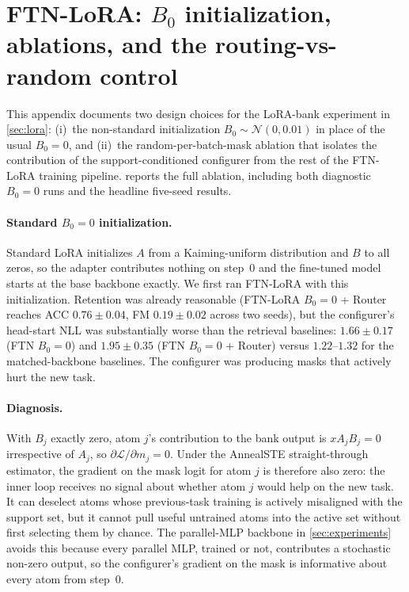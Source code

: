 \section{FTN-LoRA: $B_0$ initialization, ablations, and the routing-vs-random control}\label{app:lora_ablations}

This appendix documents two design choices for the LoRA-bank experiment in \cref{sec:lora}: (i)~the non-standard initialization $B_0\!\sim\!\mathcal{N}(0,0.01)$ in place of the usual $B_0{=}0$, and (ii)~the random-per-batch-mask ablation that isolates the contribution of the support-conditioned configurer from the rest of the FTN-LoRA training pipeline.  reports the full ablation, including both diagnostic $B_0{=}0$ runs and the headline five-seed results.

\paragraph{Standard $B_0{=}0$ initialization.}
Standard LoRA initializes $A$ from a Kaiming-uniform distribution and $B$ to all zeros, so the adapter contributes nothing on step~0 and the fine-tuned model starts at the base backbone exactly. We first ran FTN-LoRA with this initialization. Retention was already reasonable (FTN-LoRA $B_0{=}0$ + Router reaches ACC $0.76\pm0.04$, FM $0.19\pm0.02$ across two seeds), but the configurer's head-start NLL was substantially worse than the retrieval baselines: $1.66\pm0.17$ (FTN $B_0{=}0$) and $1.95\pm0.35$ (FTN $B_0{=}0$ + Router) versus $1.22$--$1.32$ for the matched-backbone baselines. The configurer was producing masks that actively hurt the new task.

\paragraph{Diagnosis.}
With $B_j$ exactly zero, atom $j$'s contribution to the bank output is $x A_j B_j = 0$ irrespective of $A_j$, so $\partial \mathcal{L}/\partial m_j = 0$. Under the AnnealSTE straight-through estimator, the gradient on the mask logit for atom $j$ is therefore also zero: the inner loop receives no signal about whether atom $j$ would help on the new task. It can deselect atoms whose previous-task training is actively misaligned with the support set, but it cannot pull useful untrained atoms into the active set without first selecting them by chance. The parallel-MLP backbone in \cref{sec:experiments} avoids this because every parallel MLP, trained or not, contributes a stochastic non-zero output, so the configurer's gradient on the mask is informative about every atom from step~0.

